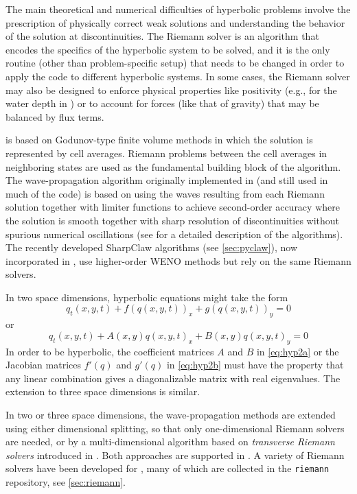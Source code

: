 The main theoretical and numerical difficulties of hyperbolic problems
involve the prescription of physically correct weak solutions and
understanding the behavior of the solution at discontinuities.  The
Riemann solver is an algorithm that encodes the specifics of the
hyperbolic system to be solved, and it is the only routine (other than
problem-specific setup) that needs to be changed in order to apply the
code to different hyperbolic systems.  In some cases, the Riemann
solver may also be designed to enforce physical properties like
positivity (e.g., for the water depth in \geoclaw) or to account for
forces (like that of gravity) that may be balanced by flux terms.

\clawpack is based on Godunov-type finite volume methods in which
the solution is represented by cell averages.  Riemann problems
between the cell averages in neighboring states are used as the
fundamental building block of the algorithm.
The wave-propagation algorithm originally
implemented in \clawpack (and still used in much of the code) is based on
using the waves resulting from each Riemann solution together with limiter
functions to achieve second-order accuracy where the solution is smooth
together with sharp resolution of discontinuities without spurious numerical
oscillations (see \cite{rjl:fvmhp} for a detailed description of the
algorithms).   The recently developed SharpClaw algorithms (see
\cref{sec:pyclaw}), now incorporated in \pyclaw, use higher-order WENO methods
but rely on the same Riemann solvers.

In two space dimensions, hyperbolic equations might take the form
\begin{equation}\label{eq:hyp2a}
q_t(x,y,t) + f(q(x,y,t))_x + g(q(x,y,t))_y = 0
\end{equation}
or
\begin{equation}\label{eq:hyp2b}
q_t(x,y,t) + A(x,y)q(x,y,t)_x + B(x,y)q(x,y,t)_y = 0
\end{equation}
In order to be hyperbolic, the coefficient matrices $A$ and $B$ in \cref{eq:hyp2a}
or the Jacobian matrices $f'(q)$ and $g'(q)$ in \cref{eq:hyp2b}
must have the property that any linear
combination gives a diagonalizable matrix with real eigenvalues.  The
extension to three space dimensions is similar.

In two or three space dimensions, the wave-propagation methods
are extended using either dimensional splitting, so that only
one-dimensional Riemann solvers are needed, or by a multi-dimensional
algorithm based on {\em transverse Riemann solvers} introduced in
\cite{rjl:wpalg}.  Both approaches are supported in \clawpack.
A variety of Riemann solvers have been developed for \clawpack, many
of which are collected in the \texttt{riemann} repository, see
\cref{sec:riemann}.

